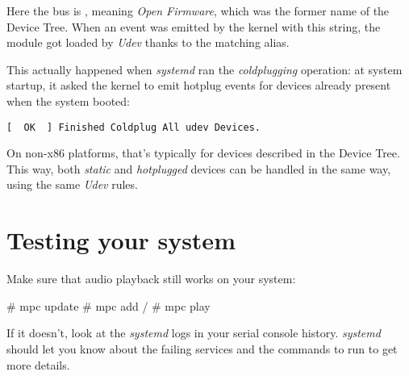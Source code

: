 Here the bus is , meaning {\em Open Firmware}, which
was the former name of the Device Tree. When an event was emitted by
the kernel with this  string, the  module
got loaded by {\em Udev} thanks to the matching alias.

This actually happened when {\em systemd} ran the {\em coldplugging}
operation: at system startup, it asked the kernel to emit hotplug events
for devices already present when the system booted:

\begin{verbatim}
[  OK  ] Finished Coldplug All udev Devices.
\end{verbatim}

On non-x86 platforms, that's typically for devices described in the
Device Tree. This way, both {\em static} and {\em hotplugged} devices
can be handled in the same way, using the same {\em Udev} rules.

\section{Testing your system}

Make sure that audio playback still works on your system:

\begin{bashinput}
# mpc update
# mpc add /
# mpc play
\end{bashinput}

If it doesn't, look at the {\em systemd} logs in your serial console
history. {\em systemd} should let you know about the failing services
and the commands to run to get more details.
